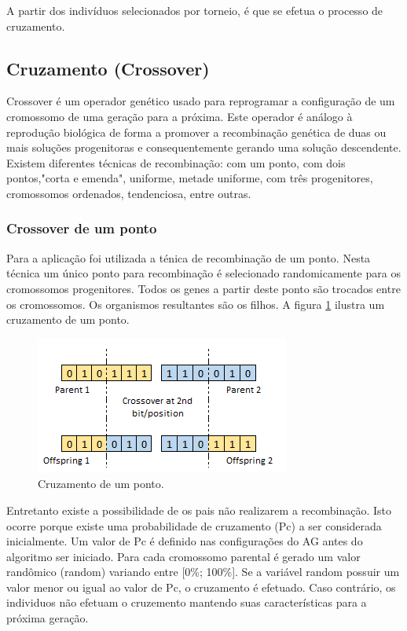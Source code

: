 \documentclass[twoside]{article}
\begin{document}
\begin{multicols}{2}
A partir dos indivíduos selecionados por torneio, é que se efetua o processo de cruzamento.

\subsection{Cruzamento (Crossover)}
Crossover é um operador genético usado para reprogramar a configuração de um cromossomo de uma geração para a próxima. Este operador é análogo à reprodução biológica de forma a promover a recombinação genética de duas ou mais soluções progenitoras e consequentemente gerando uma solução descendente. Existem diferentes técnicas de recombinação: com um ponto, com dois pontos,"corta e emenda", uniforme, metade uniforme, com três progenitores, cromossomos ordenados, tendenciosa, entre outras.

\subsubsection{Crossover de um ponto}
Para a aplicação foi utilizada a ténica de recombinação de um ponto. Nesta técnica um único ponto para recombinação é selecionado randomicamente para os cromossomos progenitores. Todos os genes a partir deste ponto são trocados entre os cromossomos. Os organismos resultantes são os filhos. A figura \ref{fig:c1p} ilustra um cruzamento de um ponto.

\begin{figure}[H]
\label{fig:c1p}
  \caption{Cruzamento de um ponto.}
  \centering
    \includegraphics[scale = 0.9]{crossover_onepoint.png}
\end{figure}

Entretanto existe a possibilidade de os pais não realizarem a recombinação. Isto ocorre porque existe uma probabilidade de cruzamento (Pc) a ser considerada inicialmente. Um valor de Pc é definido nas configurações do AG antes do algoritmo ser iniciado. Para cada cromossomo parental é gerado um valor randômico (random) variando entre [0\%; 100\%]. Se a variável random possuir um valor menor ou igual ao valor de Pc, o cruzamento é efetuado. Caso contrário, os individuos não efetuam o cruzemento mantendo suas características para a próxima geração.


\end{multicols}
\end{document}
